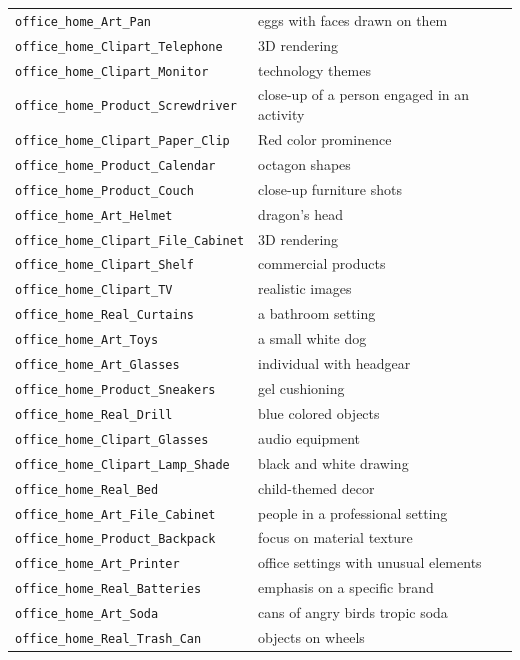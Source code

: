 \documentclass{article} %
\begin{document}
\begin{longtable}{p{} p{}}
\texttt{office\_home\_Art\_Pan} & eggs with faces drawn on them \\
\texttt{office\_home\_Clipart\_Telephone} & 3D rendering \\
\texttt{office\_home\_Clipart\_Monitor} & technology themes \\
\texttt{office\_home\_Product\_Screwdriver} & close-up of a person engaged in an activity \\
\texttt{office\_home\_Clipart\_Paper\_Clip} & Red color prominence \\
\texttt{office\_home\_Product\_Calendar} & octagon shapes \\
\texttt{office\_home\_Product\_Couch} & close-up furniture shots \\
\texttt{office\_home\_Art\_Helmet} & dragon's head \\
\texttt{office\_home\_Clipart\_File\_Cabinet} & 3D rendering \\
\texttt{office\_home\_Clipart\_Shelf} & commercial products \\
\texttt{office\_home\_Clipart\_TV} & realistic images \\
\texttt{office\_home\_Real\_Curtains} & a bathroom setting \\
\texttt{office\_home\_Art\_Toys} & a small white dog \\
\texttt{office\_home\_Art\_Glasses} & individual with headgear \\
\texttt{office\_home\_Product\_Sneakers} & gel cushioning \\
\texttt{office\_home\_Real\_Drill} & blue colored objects \\
\texttt{office\_home\_Clipart\_Glasses} & audio equipment \\
\texttt{office\_home\_Clipart\_Lamp\_Shade} & black and white drawing \\
\texttt{office\_home\_Real\_Bed} & child-themed decor \\
\texttt{office\_home\_Art\_File\_Cabinet} & people in a professional setting \\
\texttt{office\_home\_Product\_Backpack} & focus on material texture \\
\texttt{office\_home\_Art\_Printer} & office settings with unusual elements \\
\texttt{office\_home\_Real\_Batteries} & emphasis on a specific brand \\
\texttt{office\_home\_Art\_Soda} & cans of angry birds tropic soda \\
\texttt{office\_home\_Real\_Trash\_Can} & objects on wheels \\

\end{longtable}
\end{document}
